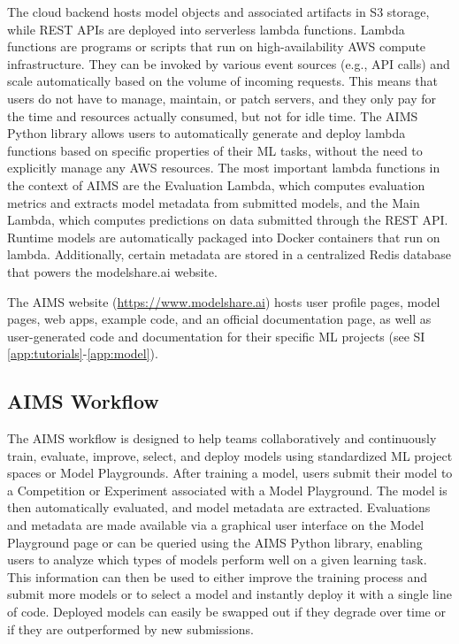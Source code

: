 The cloud backend hosts model objects and associated artifacts in S3 storage, while REST APIs are deployed into serverless lambda functions. Lambda functions are programs or scripts that run on high-availability AWS compute infrastructure. They can be invoked by various event sources (e.g., API calls) and scale automatically based on the volume of incoming requests. This means that users do not have to manage, maintain, or patch servers, and they only pay for the time and resources actually consumed, but not for idle time. The AIMS Python library allows users to automatically generate and deploy lambda functions based on specific properties of their ML tasks, without the need to explicitly manage any AWS resources. The most important lambda functions in the context of AIMS are the Evaluation Lambda, which computes evaluation metrics and extracts model metadata from submitted models, and the Main Lambda, which computes predictions on data submitted through the REST API. Runtime models are automatically packaged into Docker containers that run on lambda. Additionally, certain metadata are stored in a centralized Redis database that powers the modelshare.ai website. %

The AIMS website (\href{https://www.modelshare.ai}{https://www.modelshare.ai}) \citep{noauthor_model_nodate} hosts user profile pages, model pages, web apps, example code, and an official documentation page, as well as user-generated code and documentation for their specific ML projects (see SI \ref{app:tutorials}-\ref{app:model}). 


\subsection{AIMS Workflow}
The AIMS workflow is designed to help teams collaboratively and continuously train, evaluate, improve, select, and deploy models using standardized ML project spaces or Model Playgrounds. After training a model, users submit their model to a Competition or Experiment associated with a Model Playground. The model is then automatically evaluated, and model metadata are extracted. Evaluations and metadata are made available via a graphical user interface on the Model Playground page or can be queried using the AIMS Python library, enabling users to analyze which types of models perform well on a given learning task. This information can then be used to either improve the training process and submit more models or to select a model and instantly deploy it with a single line of code. Deployed models can easily be swapped out if they degrade over time or if they are outperformed by new submissions. 


